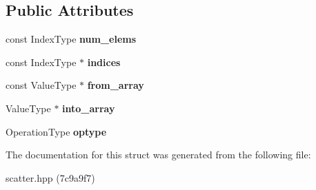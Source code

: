 \subsection*{Public Attributes}
\begin{DoxyCompactItemize}
\item 
\mbox{\label{structschwz_1_1Scatter_a43252cdb86c252b755384ce913530016}} 
const Index\+Type {\bfseries num\+\_\+elems}
\item 
\mbox{\label{structschwz_1_1Scatter_ace6df48951fb83fde6e7a69779253d8b}} 
const Index\+Type $\ast$ {\bfseries indices}
\item 
\mbox{\label{structschwz_1_1Scatter_ad956399c31d1c016f97802de1b844440}} 
const Value\+Type $\ast$ {\bfseries from\+\_\+array}
\item 
\mbox{\label{structschwz_1_1Scatter_af0f17b144ec184891ad4f3411f6d83cc}} 
Value\+Type $\ast$ {\bfseries into\+\_\+array}
\item 
\mbox{\label{structschwz_1_1Scatter_a86486db4091ef57dc8e4526f1b9e8d94}} 
Operation\+Type {\bfseries optype}
\end{DoxyCompactItemize}


The documentation for this struct was generated from the following file\+:\begin{DoxyCompactItemize}
\item 
scatter.\+hpp (7c9a9f7)\end{DoxyCompactItemize}
